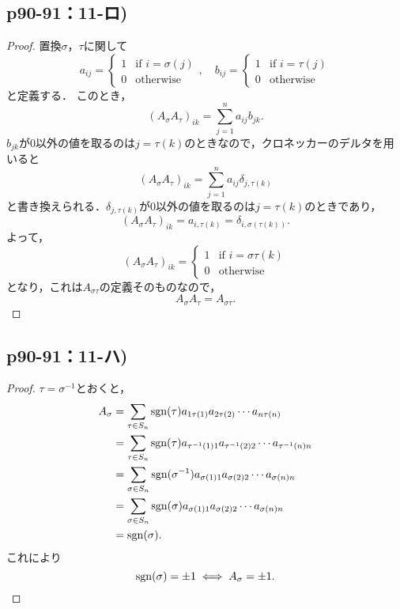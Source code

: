 \documentclass[uplatex,dvipdfmx,a4paper,11pt,fleqn]{jsarticle}
\begin{document}
\subsection*{p90-91：11-ロ)}

\begin{tleftbar}
	\begin{proof}
置換$\sigma$，$\tau$に関して
\[ 
a_{ij} = 
\begin{cases}
1 & \text{if } i = \sigma(j) \\
0 & \text{otherwise}
\end{cases},
\quad 
b_{ij}=
\begin{cases} 
1 & \text{if }  i = \tau(j) \\
0 & \text{otherwise}
\end{cases}
\]
と定義する．
このとき，
\[
(A_\sigma A_\tau)_{ik} = \sum_{j=1}^n a_{ij} b_{jk}.
\]
$b_{jk}$が$0$以外の値を取るのは$j= \tau(k)$のときなので，クロネッカーのデルタを用いると
\[
	(A_\sigma A_\tau)_{ik} =\sum_{j=1}^n a_{ij} \delta_{j,\tau(k)}
\]
と書き換えられる．$\delta_{j,\tau (k)}$が$0$以外の値を取るのは$j= \tau(k)$のときであり，
\[
	(A_\sigma A_\tau)_{ik} = a_{i, \tau(k)}=\delta_{i, \sigma(\tau(k))}.
\]
よって，
\[
(A_\sigma A_\tau)_{ik} = 
\begin{cases} 
	1 & \text{if } i=\sigma \tau(k) \\
	0 & \text{otherwise}
\end{cases}
\]
となり，これは$A_{\sigma \tau}$の定義そのものなので，
\[
A_\sigma A_\tau = A_{\sigma \tau}.
\]
\end{proof}
\end{tleftbar}


\subsection*{p90-91：11-ハ)}


\begin{tleftbar}
    \begin{proof}
    $ \tau = \sigma^{-1}$とおくと，
\begin{align*} 
     A_\sigma  &= \sum_{ \tau \in S_n} \operatorname{sgn}  (\tau) a_{1 \tau(1)} a_{2 \tau(2)} \cdots a_{n \tau(n)} \\
     & = \sum_{ \tau \in S_n} \operatorname{sgn}  (\tau) a_{\tau^{-1}(1)1} a_{\tau^{-1} (2)2} \cdots a_{\tau^{-1} (n)n} \\
     & = \sum_{\sigma \in S_n} \operatorname{sgn} (\sigma^{-1}) a_{\sigma(1)1} a_{\sigma(2)2} \cdots a_{\sigma(n)n} \\
     & = \sum_{\sigma \in S_n} \operatorname{sgn} (\sigma) a_{\sigma(1)1} a_{\sigma(2)2} \cdots a_{\sigma(n)n} \\
     & = \operatorname{sgn} (\sigma).
\end{align*} 
これにより
\[
\operatorname{sgn} (\sigma) = \pm 1 \iff A_\sigma = \pm 1.
\]
\end{proof}
\end{tleftbar}
\newpage 
\end{document}
